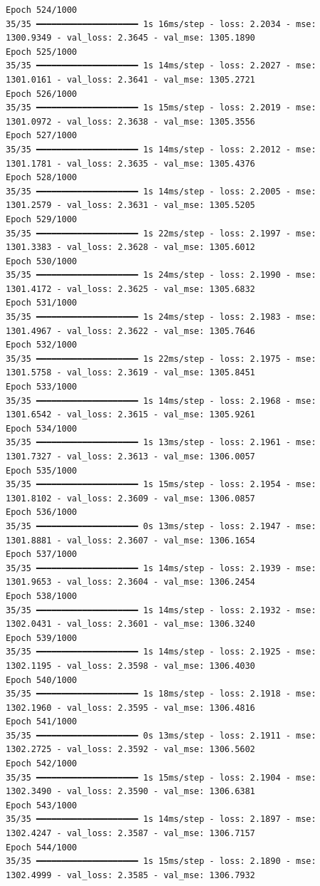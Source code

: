 \documentclass[
  letterpaper,
  DIV=11,
  numbers=noendperiod]{scrreprt}
\begin{document}
\begin{verbatim}
Epoch 524/1000
35/35 ━━━━━━━━━━━━━━━━━━━━ 1s 16ms/step - loss: 2.2034 - mse: 1300.9349 - val_loss: 2.3645 - val_mse: 1305.1890
Epoch 525/1000
35/35 ━━━━━━━━━━━━━━━━━━━━ 1s 14ms/step - loss: 2.2027 - mse: 1301.0161 - val_loss: 2.3641 - val_mse: 1305.2721
Epoch 526/1000
35/35 ━━━━━━━━━━━━━━━━━━━━ 1s 15ms/step - loss: 2.2019 - mse: 1301.0972 - val_loss: 2.3638 - val_mse: 1305.3556
Epoch 527/1000
35/35 ━━━━━━━━━━━━━━━━━━━━ 1s 14ms/step - loss: 2.2012 - mse: 1301.1781 - val_loss: 2.3635 - val_mse: 1305.4376
Epoch 528/1000
35/35 ━━━━━━━━━━━━━━━━━━━━ 1s 14ms/step - loss: 2.2005 - mse: 1301.2579 - val_loss: 2.3631 - val_mse: 1305.5205
Epoch 529/1000
35/35 ━━━━━━━━━━━━━━━━━━━━ 1s 22ms/step - loss: 2.1997 - mse: 1301.3383 - val_loss: 2.3628 - val_mse: 1305.6012
Epoch 530/1000
35/35 ━━━━━━━━━━━━━━━━━━━━ 1s 24ms/step - loss: 2.1990 - mse: 1301.4172 - val_loss: 2.3625 - val_mse: 1305.6832
Epoch 531/1000
35/35 ━━━━━━━━━━━━━━━━━━━━ 1s 24ms/step - loss: 2.1983 - mse: 1301.4967 - val_loss: 2.3622 - val_mse: 1305.7646
Epoch 532/1000
35/35 ━━━━━━━━━━━━━━━━━━━━ 1s 22ms/step - loss: 2.1975 - mse: 1301.5758 - val_loss: 2.3619 - val_mse: 1305.8451
Epoch 533/1000
35/35 ━━━━━━━━━━━━━━━━━━━━ 1s 14ms/step - loss: 2.1968 - mse: 1301.6542 - val_loss: 2.3615 - val_mse: 1305.9261
Epoch 534/1000
35/35 ━━━━━━━━━━━━━━━━━━━━ 1s 13ms/step - loss: 2.1961 - mse: 1301.7327 - val_loss: 2.3613 - val_mse: 1306.0057
Epoch 535/1000
35/35 ━━━━━━━━━━━━━━━━━━━━ 1s 15ms/step - loss: 2.1954 - mse: 1301.8102 - val_loss: 2.3609 - val_mse: 1306.0857
Epoch 536/1000
35/35 ━━━━━━━━━━━━━━━━━━━━ 0s 13ms/step - loss: 2.1947 - mse: 1301.8881 - val_loss: 2.3607 - val_mse: 1306.1654
Epoch 537/1000
35/35 ━━━━━━━━━━━━━━━━━━━━ 1s 14ms/step - loss: 2.1939 - mse: 1301.9653 - val_loss: 2.3604 - val_mse: 1306.2454
Epoch 538/1000
35/35 ━━━━━━━━━━━━━━━━━━━━ 1s 14ms/step - loss: 2.1932 - mse: 1302.0431 - val_loss: 2.3601 - val_mse: 1306.3240
Epoch 539/1000
35/35 ━━━━━━━━━━━━━━━━━━━━ 1s 14ms/step - loss: 2.1925 - mse: 1302.1195 - val_loss: 2.3598 - val_mse: 1306.4030
Epoch 540/1000
35/35 ━━━━━━━━━━━━━━━━━━━━ 1s 18ms/step - loss: 2.1918 - mse: 1302.1960 - val_loss: 2.3595 - val_mse: 1306.4816
Epoch 541/1000
35/35 ━━━━━━━━━━━━━━━━━━━━ 0s 13ms/step - loss: 2.1911 - mse: 1302.2725 - val_loss: 2.3592 - val_mse: 1306.5602
Epoch 542/1000
35/35 ━━━━━━━━━━━━━━━━━━━━ 1s 15ms/step - loss: 2.1904 - mse: 1302.3490 - val_loss: 2.3590 - val_mse: 1306.6381
Epoch 543/1000
35/35 ━━━━━━━━━━━━━━━━━━━━ 1s 14ms/step - loss: 2.1897 - mse: 1302.4247 - val_loss: 2.3587 - val_mse: 1306.7157
Epoch 544/1000
35/35 ━━━━━━━━━━━━━━━━━━━━ 1s 15ms/step - loss: 2.1890 - mse: 1302.4999 - val_loss: 2.3585 - val_mse: 1306.7932

\end{verbatim}
\end{document}
